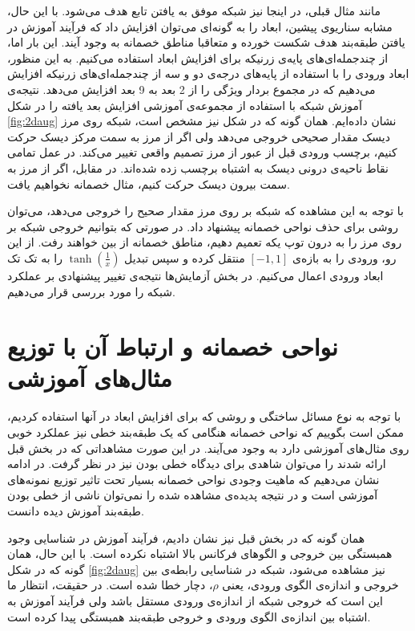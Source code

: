 \documentclass[12pt,onecolumn,a4paper]{article}
\begin{document}
مانند مثال قبلی، در اینجا نیز شبکه موفق به یافتن تابع هدف می‌شود. با این حال، مشابه سناریوی پیشین، ابعاد را به گونه‌ای می‌توان افزایش داد که فرآیند آموزش در یافتن طبقه‌بند هدف شکست خورده و متعاقبا مناطق خصمانه به وجود آیند. این بار اما، از چندجمله‌ای‌های پایه‌ی زرنیکه برای افزایش ابعاد استفاده می‌کنیم. به این منظور، ابعاد ورودی را با استفاده از پایه‌های درجه‌ی دو و سه از چندجمله‌ای‌های زرنیکه افزایش می‌دهیم که در مجموع بردار ویژگی را از 2 بعد به 9 بعد افزایش می‌دهد. نتیجه‌ی آموزش شبکه با استفاده از مجموعه‌ی آموزشی افزایش بعد یافته را در شکل \ref{fig:2daug} نشان داده‌ایم. همان گونه که در شکل نیز مشخص است، شبکه روی مرز دیسک مقدار صحیحی خروجی می‌دهد ولی اگر از مرز به سمت مرکز دیسک حرکت کنیم، برچسب ورودی قبل از عبور از مرز تصمیم واقعی تغییر می‌کند. در عمل تمامی نقاط ناحیه‌ی درونی دیسک به اشتباه برچسب زده شده‌اند. در مقابل، اگر از مرز به سمت بیرون دیسک حرکت کنیم، مثال خصمانه نخواهیم یافت.

با توجه به این مشاهده که شبکه بر روی مرز مقدار صحیح را خروجی می‌دهد، می‌توان روشی برای حذف نواحی خصمانه پیشنهاد داد. در صورتی که بتوانیم خروجی شبکه بر روی مرز را به درون توپ یکه تعمیم دهیم، مناطق خصمانه از بین خواهند رفت. از این رو، ورودی را به بازه‌ی $[-1,1]$ منتقل کرده و سپس تبدیل $\tanh(\frac{1}{x})$ را به تک تک ابعاد ورودی اعمال می‌کنیم. در بخش آزمایش‌ها نتیجه‌ی تغییر پیشنهادی بر عملکرد شبکه را مورد بررسی قرار می‌دهیم. 

\section{نواحی خصمانه و ارتباط آن با توزیع مثال‌های آموزشی}
با توجه به نوع مسائل ساختگی و روشی که برای افزایش ابعاد در آنها استفاده کردیم، ممکن است بگوییم که نواحی خصمانه هنگامی که یک طبقه‌بند خطی نیز عملکرد خوبی روی مثال‌های آموزشی دارد به وجود می‌آیند. در این صورت مشاهداتی که در بخش قبل ارائه شدند را می‌توان شاهدی برای دیدگاه خطی بودن نیز در نظر گرفت. در ادامه نشان می‌دهیم که ماهیت وجودی نواحی خصمانه بسیار تحت تاثیر توزیع نمونه‌های آموزشی است و در نتیجه پدیده‌ی مشاهده شده را نمی‌توان ناشی از خطی بودن طبقه‌بند آموزش دیده دانست.

همان گونه که در بخش قبل نیز نشان دادیم، فرآیند آموزش در شناسایی وجود همبستگی بین خروجی و الگوهای فرکانس بالا اشتباه نکرده است. با این حال، همان گونه که در شکل \ref{fig:2daug} نیز مشاهده می‌شود، شبکه در شناسایی رابطه‌ی بین خروجی و اندازه‌ی الگوی ورودی، یعنی $\rho$، دچار خطا شده است. در حقیقت، انتظار ما این است که خروجی شبکه از اندازه‌ی ورودی مستقل باشد ولی فرآیند آموزش به اشتباه بین اندازه‌ی الگوی ورودی و خروجی طبقه‌بند همبستگی پیدا کرده است.
\end{document}
